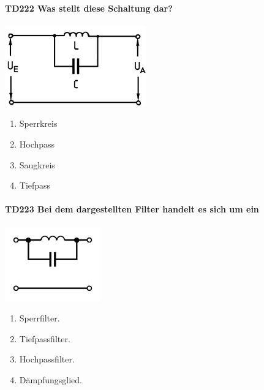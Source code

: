 \documentclass[8pt]{article}
\begin{document}
\begin{enumerate}
\begin{enumerate}[nolistsep,label=\Alph*]
{\paragraph*{TD222 Was stellt diese Schaltung dar?}
\begin{center}
	\begin{minipage}{\linewidth}
		\centering
		\includegraphics[scale=1.0]{pics/td222_a.jpg}
	\end{minipage}
\end{center}
\begin{enumerate}[nolistsep,label=\Alph*]
\item Sperrkreis
\item Hochpass
\item Saugkreis
\item Tiefpass
\end{enumerate}

\paragraph*{TD223 Bei dem dargestellten Filter handelt es sich um ein}
\begin{center}
	\begin{minipage}{\linewidth}
		\centering
		\includegraphics[scale=1.0]{pics/td223_a.jpg}
	\end{minipage}
\end{center}
\begin{enumerate}[nolistsep,label=\Alph*]
\item Sperrfilter.
\item Tiefpassfilter.
\item Hochpassfilter.
\item Dämpfungsglied.
\end{enumerate}

}
\end{enumerate}
\end{enumerate}
\end{document}

